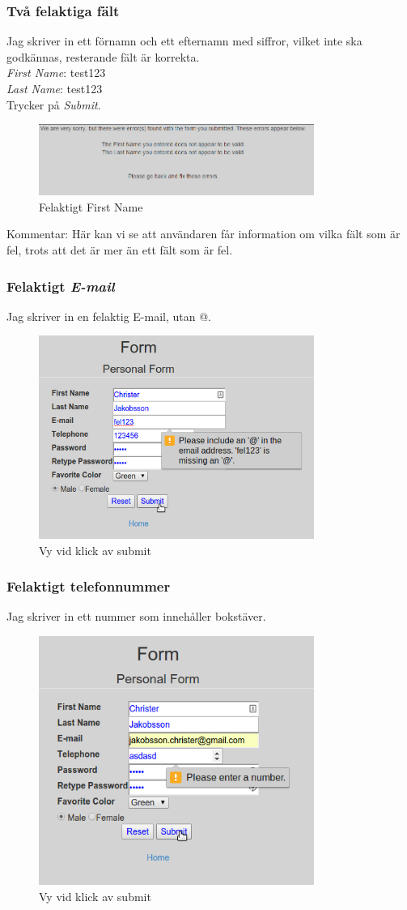 \documentclass[11pt, titlepage, oneside, a4paper]{article}
\newcommand{\Subsubsection}[1]{\vspace{-4pt}\subsubsection{#1}\vspace{-8pt}}
\begin{document}
		\newpage
		\Subsubsection{Två felaktiga fält}
		Jag skriver in ett förnamn och ett efternamn med siffror, vilket inte ska godkännas, resterande fält är korrekta.\\ 
		\emph{First Name}: test123 \\
		\emph{Last Name}: test123 \\
		Trycker på \emph{Submit}.
				\begin{figure}[ht!]
				\centering
				\includegraphics[width=90mm]{del1_tvafel.png}
				\caption{Felaktigt First Name}
				\end{figure}
		
			Kommentar: Här kan vi se att användaren får information om vilka fält som är fel, trots att det är mer än ett fält som är fel.
				
				\Subsubsection{Felaktigt \emph{E-mail}}
				Jag skriver in en felaktig E-mail, utan @.
				\begin{figure}[ht!]
				\centering
				\includegraphics[width=90mm]{del1_fel_email.png}
				\caption{Vy vid klick av submit}
				\end{figure}
		
		\newpage
		\Subsubsection{Felaktigt telefonnummer}
		Jag skriver in ett nummer som innehåller bokstäver.
		
		\begin{figure}[ht!]
		\centering
		\includegraphics[width=90mm]{del1_fel_telefon.png}
		\caption{Vy vid klick av submit}
		\end{figure}
		
\end{document}
